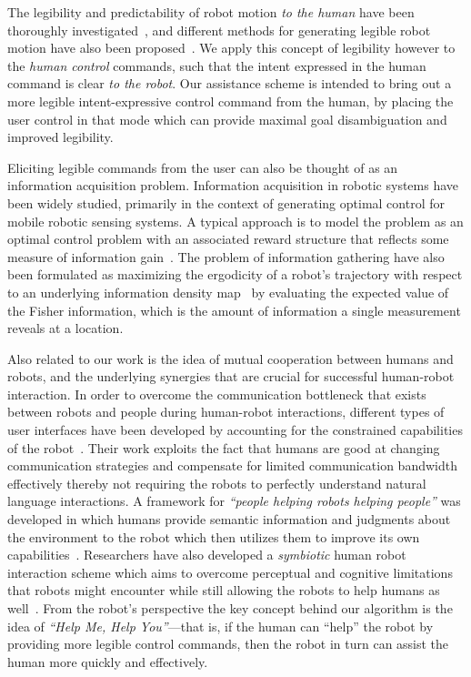 \documentclass[conference]{IEEEtran}
\begin{document}
The legibility and predictability of robot motion \textit{to the human} have been thoroughly investigated~\cite{dragan2013legibility}, and different methods for generating legible robot motion have also been proposed~\cite{holladay2014legible}. We apply this concept of legibility however to the \textit{human control} commands, such that the intent expressed in the human command is clear \textit{to the robot}. Our assistance scheme is intended to bring out a more legible intent-expressive control command from the human, by placing the user control in that mode which can provide maximal goal disambiguation and improved legibility.

Eliciting legible commands from the user can also be thought of as an information acquisition problem. Information acquisition in robotic systems  have been widely studied, primarily in the context of generating optimal control for mobile robotic sensing systems. A typical approach is to model the problem as an optimal control problem with an associated reward structure that reflects some measure of information gain~\cite{atanasov2014information}. The problem of information gathering have also been formulated as maximizing the ergodicity of a robot's trajectory with respect to an underlying information density map~\cite{miller2013trajectory,miller2016ergodic} by evaluating the expected value of the Fisher information, which is the amount of information a single measurement reveals at a location. 


Also related to our work is the idea of mutual cooperation between humans and robots, and the underlying synergies that are crucial for successful human-robot interaction. In order to overcome the communication bottleneck that exists between robots and people during human-robot interactions, different types of user interfaces have been developed by accounting for the constrained capabilities of the robot~\cite{goodfellow2010help}. Their work exploits the fact that humans are good at changing communication strategies and compensate for limited communication bandwidth effectively thereby not requiring the robots to perfectly understand natural language interactions. A framework for \textit{``people helping robots helping people''} was developed in which humans provide semantic information and judgments about the environment to the robot which then utilizes them to improve its own capabilities~\cite{sorokin2010people}. Researchers have also developed a \textit{symbiotic} human robot interaction scheme which aims to overcome perceptual and cognitive limitations that robots might encounter while still allowing the robots to help humans as well~\cite{rosenthal2010effective}. From the robot's perspective the key concept behind our algorithm is the idea of \textit{``Help Me, Help You''}---that is, if the human can ``help'' the robot by providing more legible control commands, then the robot in turn can assist the human more quickly and effectively.
\end{document}

